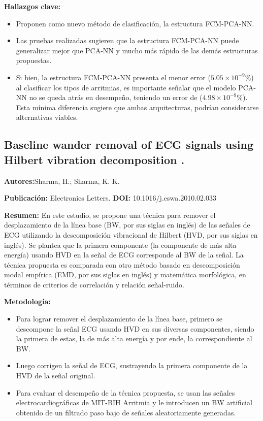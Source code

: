 \documentclass[12pt,letterpaper,oneside,openright]{book}
\begin{document}
\textbf{Hallazgos clave:}
\begin{itemize}
	\item Proponen como nuevo método de clasificación, la estructura FCM-PCA-NN.
	\item Las pruebas realizadas sugieren que la estructura FCM-PCA-NN puede generalizar mejor que PCA-NN y mucho más rápido de las demás estructuras propuestas.
	\item Si bien, la estructura FCM-PCA-NN presenta el menor error ($5.05\times10^{-9} \% $) al clasificar los tipos de arritmias, es importante señalar que el modelo PCA-NN no se queda atrás en desempeño, teniendo un error de ($4.98\times10^{-9} \%$). Esta mínima diferencia sugiere que ambas arquitecturas, podrían considerarse alternativas viables.
\end{itemize}

\subsection{Baseline wander removal of ECG signals using Hilbert vibration decomposition \cite{Sharma15}.}

\textbf{Autores:}Sharma, H.; Sharma, K. K.

\textbf{Publicación:} Electronics Letters.
\textbf{DOI:} 10.1016/j.eswa.2010.02.033

\textbf{Resumen:} En este estudio, se propone una técnica para remover el desplazamiento de la línea base (BW, por sus siglas en inglés) de las señales de ECG utilizando la descomposición vibracional de Hilbert (HVD, por sus siglas en inglés). Se plantea que la primera componente (la componente de más alta energía) usando HVD en la señal de ECG corresponde al BW de la señal. La técnica propuesta es comparada con otro método basado en descomposición modal empírica (EMD, por sus siglas en inglés) y matemática morfológica, en términos de criterios de correlación y relación señal-ruido. 

\textbf{Metodología:}
\begin{itemize}
	\item Para lograr remover el desplazamiento de la línea base, primero se descompone la señal ECG usando HVD en sus diversas componentes, siendo la primera de estas, la de más alta energía y por ende, la correspondiente al BW.
	\item Luego corrigen la señal de ECG, sustrayendo la primera componente de la HVD de la señal original.
	\item Para evaluar el desempeño de la técnica propuesta, se usan las señales electrocardiográficas de MIT-BIH Arritmia \cite{arritmiadb} y le introducen un BW artificial obtenido de un filtrado paso bajo de señales aleatoriamente generadas.
\end{itemize}
\end{document}
